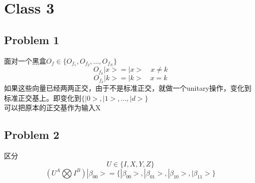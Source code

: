 \documentclass[a4paper, 11pt]{article} %
\begin{document}
\section{Class 3}
\subsection{Problem 1}
面对一个黑盒$O_f \in \lbrace O_{f_1},O_{f_2},...,O_{f_N} \rbrace$
$$
O_{f_k}|x> = |x> \quad x\ne k
$$
$$
O_{f_k}|k> = |k> \quad x = k
$$
如果这些向量已经两两正交，由于不是标准正交，就做一个unitary操作，变化到标准正交基上。即变化到$\lbrace |0>,|1>,...,|d> \rbrace$\\
可以把原本的正交基作为输入X
\subsection{Problem 2}
区分
$$
U \in \lbrace I,X,Y,Z \rbrace
$$
$$
(U^A\bigotimes I^B)|\beta_{00}> = \lbrace |\beta_{00}>,|\beta_{01}>,|\beta_{10}>,|\beta_{11}> \rbrace
$$
\end{document}
